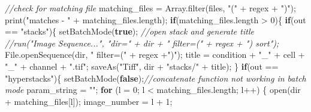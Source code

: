 \documentclass[
  12pt,
  a4paper,
]{book}
\newenvironment{Shaded}{}{}
\newcommand{\CommentTok}[1]{\textcolor[rgb]{0.38,0.63,0.69}{\textit{#1}}}
\newcommand{\ControlFlowTok}[1]{\textcolor[rgb]{0.00,0.44,0.13}{\textbf{#1}}}
\newcommand{\DecValTok}[1]{\textcolor[rgb]{0.25,0.63,0.44}{#1}}
\newcommand{\KeywordTok}[1]{\textcolor[rgb]{0.00,0.44,0.13}{\textbf{#1}}}
\newcommand{\NormalTok}[1]{#1}
\newcommand{\OperatorTok}[1]{\textcolor[rgb]{0.40,0.40,0.40}{#1}}
\newcommand{\StringTok}[1]{\textcolor[rgb]{0.25,0.44,0.63}{#1}}
\begin{document}
\begin{Shaded}
\begin{Highlighting}[]
            \CommentTok{//check for matching file}
\NormalTok{            matching\_files }\OperatorTok{=}\NormalTok{ Array}\OperatorTok{.}\NormalTok{filter}\OperatorTok{(}\NormalTok{files}\OperatorTok{,} \StringTok{"("} \OperatorTok{+}\NormalTok{ regex }\OperatorTok{+} \StringTok{")"}\OperatorTok{);}
\NormalTok{            print}\OperatorTok{(}\StringTok{"matches {-} "} \OperatorTok{+}\NormalTok{ matching\_files}\OperatorTok{.}\NormalTok{length}\OperatorTok{);}
            \ControlFlowTok{if}\OperatorTok{(}\NormalTok{matching\_files}\OperatorTok{.}\NormalTok{length }\OperatorTok{\textgreater{}} \DecValTok{0}\OperatorTok{)\{}
                \ControlFlowTok{if}\OperatorTok{(}\NormalTok{out }\OperatorTok{==} \StringTok{"stacks"}\OperatorTok{)\{}
\NormalTok{                    setBatchMode}\OperatorTok{(}\KeywordTok{true}\OperatorTok{);}
                \CommentTok{//open stack and generate title}
                    \CommentTok{//run("Image Sequence...", "dir=" + dir + " filter=(" + regex + ") sort");}
\NormalTok{                    File}\OperatorTok{.}\NormalTok{openSequence}\OperatorTok{(}\NormalTok{dir}\OperatorTok{,} \StringTok{" filter=("} \OperatorTok{+}\NormalTok{ regex }\OperatorTok{+}\StringTok{")"}\OperatorTok{);}
\NormalTok{                    title }\OperatorTok{=}\NormalTok{ condition }\OperatorTok{+} \StringTok{"\_"} \OperatorTok{+}\NormalTok{ cell }\OperatorTok{+} \StringTok{"\_"} \OperatorTok{+}\NormalTok{ channel }\OperatorTok{+} \StringTok{".tif"}\OperatorTok{;}
\NormalTok{                    saveAs}\OperatorTok{(}\StringTok{"Tiff"}\OperatorTok{,}\NormalTok{ dir }\OperatorTok{+} \StringTok{"stacks/"} \OperatorTok{+}\NormalTok{ title}\OperatorTok{);}
                \OperatorTok{\}}
                \ControlFlowTok{if}\OperatorTok{(}\NormalTok{out }\OperatorTok{==} \StringTok{"hyperstacks"}\OperatorTok{)\{}
\NormalTok{                    setBatchMode}\OperatorTok{(}\KeywordTok{false}\OperatorTok{);}\CommentTok{//concatenate function not working in batch mode}
\NormalTok{                    param\_string }\OperatorTok{=} \StringTok{""}\OperatorTok{;}
                    \ControlFlowTok{for} \OperatorTok{(}\NormalTok{l }\OperatorTok{=} \DecValTok{0}\OperatorTok{;}\NormalTok{ l }\OperatorTok{\textless{}}\NormalTok{ matching\_files}\OperatorTok{.}\NormalTok{length}\OperatorTok{;}\NormalTok{ l}\OperatorTok{++)} \OperatorTok{\{}
\NormalTok{                        open}\OperatorTok{(}\NormalTok{dir }\OperatorTok{+}\NormalTok{ matching\_files}\OperatorTok{[}\NormalTok{l}\OperatorTok{]);}
\NormalTok{                        image\_number }\OperatorTok{=}\NormalTok{ l }\OperatorTok{+} \DecValTok{1}\OperatorTok{;}

\end{Highlighting}
\end{Shaded}
\end{document}
